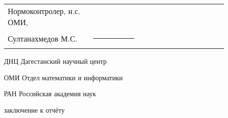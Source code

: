 \documentclass[utf8,usehyperref,12pt]{G7-32}
\begin{document}

\frontmatter %

\NirTitle{%





} %


\Executors %
\begin{longtable}{p{0.35\linewidth}p{0.2\linewidth}p{0.35\linewidth}}


Нормоконтролер, н.с. ОМИ,  &		&	\\
Султанахмедов М.С. & \rule{1\linewidth}{0.1pt}& \\
\end{longtable}



\setcounter{tocdepth}{2} %

\tableofcontents



\Abbreviations %
\begin{abbreviation}
\item[ДНЦ] Дагестанский научный центр
\item[ОМИ] Отдел математики и информатики
\item[РАН] Российская академия наук
\end{abbreviation}




\mainmatter %







\backmatter %

 заключение к отчёту



\end{document}
